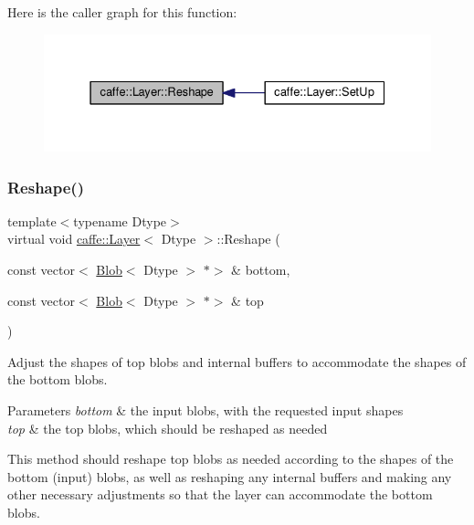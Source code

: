 Here is the caller graph for this function\+:
\nopagebreak
\begin{figure}[H]
\begin{center}
\leavevmode
\includegraphics[width=331pt]{classcaffe_1_1_layer_a7fe981e8af8d93d587acf2a952be563d_icgraph}
\end{center}
\end{figure}
\mbox{\label{classcaffe_1_1_layer_a7fe981e8af8d93d587acf2a952be563d}} 
\subsubsection{\texorpdfstring{Reshape()}{Reshape()}\hspace{0.1cm}{\footnotesize\ttfamily [2/2]}}
{\footnotesize\ttfamily template$<$typename Dtype$>$ \\
virtual void \mbox{\hyperlink{classcaffe_1_1_layer}{caffe\+::\+Layer}}$<$ Dtype $>$\+::Reshape (\begin{DoxyParamCaption}\item[{const vector$<$ \mbox{\hyperlink{classcaffe_1_1_blob}{Blob}}$<$ Dtype $>$ $\ast$$>$ \&}]{bottom,  }\item[{const vector$<$ \mbox{\hyperlink{classcaffe_1_1_blob}{Blob}}$<$ Dtype $>$ $\ast$$>$ \&}]{top }\end{DoxyParamCaption})\hspace{0.3cm}{\ttfamily [pure virtual]}}



Adjust the shapes of top blobs and internal buffers to accommodate the shapes of the bottom blobs. 


\begin{DoxyParams}{Parameters}
{\em bottom} & the input blobs, with the requested input shapes \\
\hline
{\em top} & the top blobs, which should be reshaped as needed\\
\hline
\end{DoxyParams}
This method should reshape top blobs as needed according to the shapes of the bottom (input) blobs, as well as reshaping any internal buffers and making any other necessary adjustments so that the layer can accommodate the bottom blobs. 

